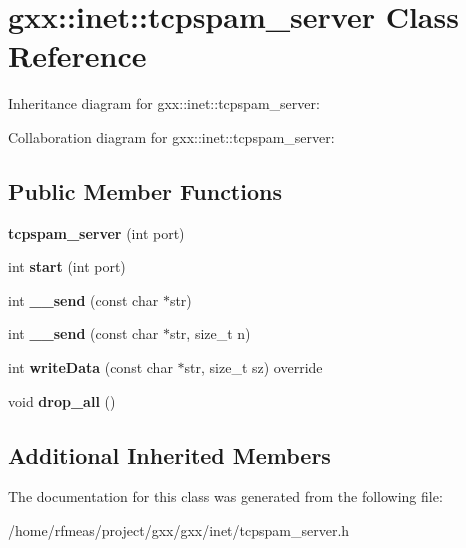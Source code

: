 \hypertarget{classgxx_1_1inet_1_1tcpspam__server}{}\section{gxx\+:\+:inet\+:\+:tcpspam\+\_\+server Class Reference}
\label{classgxx_1_1inet_1_1tcpspam__server}


Inheritance diagram for gxx\+:\+:inet\+:\+:tcpspam\+\_\+server\+:


Collaboration diagram for gxx\+:\+:inet\+:\+:tcpspam\+\_\+server\+:
\subsection*{Public Member Functions}
\begin{DoxyCompactItemize}
\item 
{\bfseries tcpspam\+\_\+server} (int port)\hypertarget{classgxx_1_1inet_1_1tcpspam__server_a947b27f315419d5f96a3af415b220855}{}\label{classgxx_1_1inet_1_1tcpspam__server_a947b27f315419d5f96a3af415b220855}

\item 
int {\bfseries start} (int port)\hypertarget{classgxx_1_1inet_1_1tcpspam__server_abff6e174ec77d5602ac19bcdc6b164b5}{}\label{classgxx_1_1inet_1_1tcpspam__server_abff6e174ec77d5602ac19bcdc6b164b5}

\item 
int {\bfseries \+\_\+\+\_\+send} (const char $\ast$str)\hypertarget{classgxx_1_1inet_1_1tcpspam__server_aec7dbca9186c197d95798764616c956d}{}\label{classgxx_1_1inet_1_1tcpspam__server_aec7dbca9186c197d95798764616c956d}

\item 
int {\bfseries \+\_\+\+\_\+send} (const char $\ast$str, size\+\_\+t n)\hypertarget{classgxx_1_1inet_1_1tcpspam__server_ad2a31b5b9e8db468a4a47e80b61f5a99}{}\label{classgxx_1_1inet_1_1tcpspam__server_ad2a31b5b9e8db468a4a47e80b61f5a99}

\item 
int {\bfseries write\+Data} (const char $\ast$str, size\+\_\+t sz) override\hypertarget{classgxx_1_1inet_1_1tcpspam__server_aedba639ceb39ce81055af2d3df88cd07}{}\label{classgxx_1_1inet_1_1tcpspam__server_aedba639ceb39ce81055af2d3df88cd07}

\item 
void {\bfseries drop\+\_\+all} ()\hypertarget{classgxx_1_1inet_1_1tcpspam__server_a131d8cd08b0e53056218119837b63922}{}\label{classgxx_1_1inet_1_1tcpspam__server_a131d8cd08b0e53056218119837b63922}

\end{DoxyCompactItemize}
\subsection*{Additional Inherited Members}


The documentation for this class was generated from the following file\+:\begin{DoxyCompactItemize}
\item 
/home/rfmeas/project/gxx/gxx/inet/tcpspam\+\_\+server.\+h\end{DoxyCompactItemize}
